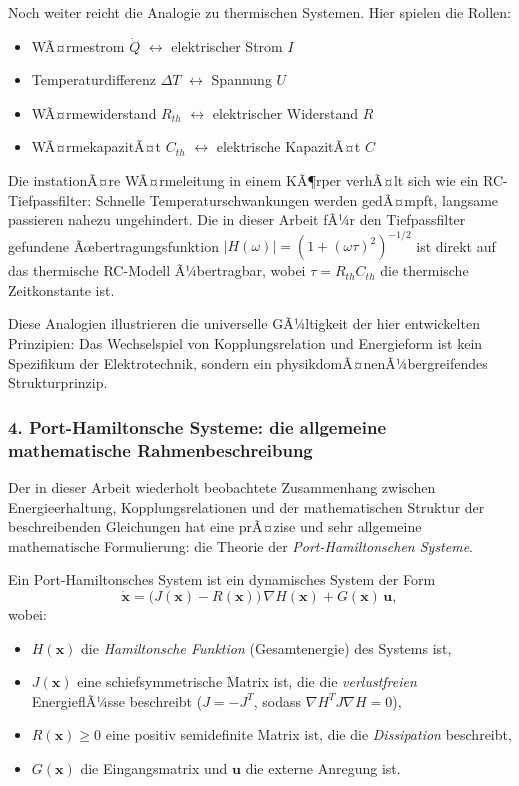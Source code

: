 ﻿\documentclass[12pt, a4paper]{article}
\begin{document}
	Noch weiter reicht die Analogie zu thermischen Systemen. Hier spielen die Rollen:
	\begin{itemize}
		\item WÃ¤rmestrom $\dot{Q}$ $\leftrightarrow$ elektrischer Strom $I$
		\item Temperaturdifferenz $\Delta T$ $\leftrightarrow$ Spannung $U$
		\item WÃ¤rmewiderstand $R_{th}$ $\leftrightarrow$ elektrischer Widerstand $R$
		\item WÃ¤rmekapazitÃ¤t $C_{th}$ $\leftrightarrow$ elektrische KapazitÃ¤t $C$
	\end{itemize}
	Die instationÃ¤re WÃ¤rmeleitung in einem KÃ¶rper verhÃ¤lt sich wie ein RC-Tiefpassfilter: Schnelle Temperaturschwankungen werden gedÃ¤mpft, langsame passieren nahezu ungehindert. Die in dieser Arbeit fÃ¼r den Tiefpassfilter gefundene Ãœbertragungsfunktion $|H(\omega)| = (1 + (\omega\tau)^2)^{-1/2}$ ist direkt auf das thermische RC-Modell Ã¼bertragbar, wobei $\tau = R_{th} C_{th}$ die thermische Zeitkonstante ist.

	Diese Analogien illustrieren die universelle GÃ¼ltigkeit der hier entwickelten Prinzipien: Das Wechselspiel von Kopplungsrelation und Energieform ist kein Spezifikum der Elektrotechnik, sondern ein physikdomÃ¤nenÃ¼bergreifendes Strukturprinzip.

	\subsubsection*{4. \quad Port-Hamiltonsche Systeme: die allgemeine mathematische Rahmenbeschreibung}

	Der in dieser Arbeit wiederholt beobachtete Zusammenhang zwischen Energieerhaltung, Kopplungsrelationen und der mathematischen Struktur der beschreibenden Gleichungen hat eine prÃ¤zise und sehr allgemeine mathematische Formulierung: die Theorie der \textit{Port-Hamiltonschen Systeme}.

	Ein Port-Hamiltonsches System ist ein dynamisches System der Form
	\begin{equation}
		\dot{\mathbf{x}} = \bigl(J(\mathbf{x}) - R(\mathbf{x})\bigr)\, \nabla H(\mathbf{x}) + G(\mathbf{x})\, \mathbf{u},
	\end{equation}
	wobei:
	\begin{itemize}
		\item $H(\mathbf{x})$ die \textit{Hamiltonsche Funktion} (Gesamtenergie) des Systems ist,
		\item $J(\mathbf{x})$ eine schiefsymmetrische Matrix ist, die die \textit{verlustfreien} EnergieflÃ¼sse beschreibt ($J = -J^T$, sodass $\nabla H^T J \nabla H = 0$),
		\item $R(\mathbf{x}) \geq 0$ eine positiv semidefinite Matrix ist, die die \textit{Dissipation} beschreibt,
		\item $G(\mathbf{x})$ die Eingangsmatrix und $\mathbf{u}$ die externe Anregung ist.
	\end{itemize}
\end{document}
